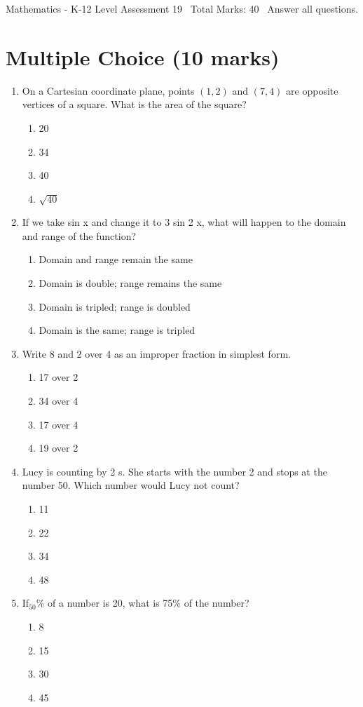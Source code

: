 \documentclass[12pt]{article}
\begin{document}
\begin{center}
Mathematics - K-12 Level Assessment 19 \
Total Marks: 40 \
Answer all questions.
\end{center}

\section*{Multiple Choice (10 marks)}
\begin{enumerate}[label=\arabic*.]
\item On a Cartesian coordinate plane, points $(1,2)$ and $(7, 4)$ are opposite vertices of a square. What is the area of the square?
\begin{enumerate}[label=(\alph*)]
    \item 20
    \item 34
    \item 40
    \item \ensuremath{\sqrt{40}}
\end{enumerate}
\item If we take sin x and change it to 3 sin 2 x, what will happen to the domain and range of the function?
\begin{enumerate}[label=(\alph*)]
    \item Domain and range remain the same
    \item Domain is double; range remains the same
    \item Domain is tripled; range is doubled
    \item Domain is the same; range is tripled
\end{enumerate}
\item Write 8 and 2 over 4 as an improper fraction in simplest form.
\begin{enumerate}[label=(\alph*)]
    \item 17 over 2
    \item 34 over 4
    \item 17 over 4
    \item 19 over 2
\end{enumerate}
\item Lucy is counting by 2 s. She starts with the number 2 and stops at the number 50. Which number would Lucy not count?
\begin{enumerate}[label=(\alph*)]
    \item 11
    \item 22
    \item 34
    \item 48
\end{enumerate}
\item If$_{50}$\% of a number is 20, what is 75\% of the number?
\begin{enumerate}[label=(\alph*)]
    \item 8
    \item 15
    \item 30
    \item 45
\end{enumerate}
\end{enumerate}
\end{document}
